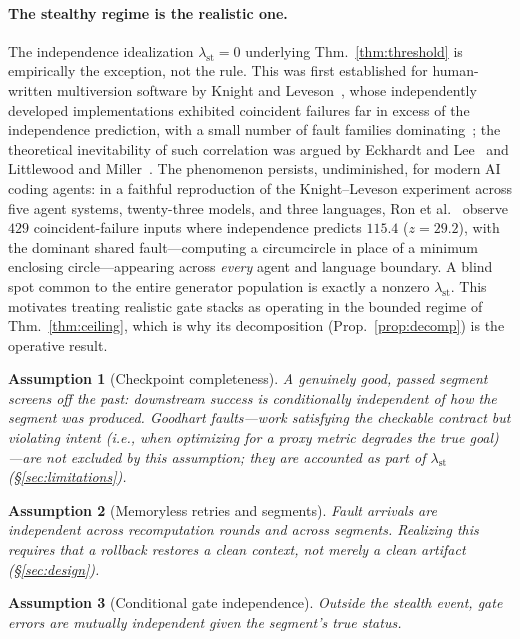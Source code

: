 \documentclass[11pt]{article}
\newtheorem{assumption}{Assumption}
\theoremstyle{remark}
\newcommand{\lst}{\lambda_{\mathrm{st}}}
\begin{document}
\paragraph{The stealthy regime is the realistic one.} The independence idealization $\lst=0$
underlying Thm.~\ref{thm:threshold} is empirically the exception, not the rule.
This was first
established for human-written multiversion software by Knight and Leveson~\cite{knight1986}, whose
independently developed implementations exhibited coincident failures far in excess of the
independence prediction, with a small number of fault families dominating~\cite{brilliant1990};
the theoretical inevitability of such correlation was argued by Eckhardt and Lee~\cite{eckhardt1985}
and Littlewood and Miller~\cite{littlewood1989}.
The phenomenon persists, undiminished, for modern
AI coding agents: in a faithful reproduction of the Knight--Leveson experiment across five agent
systems, twenty-three models, and three languages, Ron et al.~\cite{ron2026} observe $429$
coincident-failure inputs where independence predicts $115.4$ ($z=29.2$), with the dominant
shared fault---computing a circumcircle in place of a minimum enclosing circle---appearing across
\emph{every} agent and language boundary.
A blind spot common to the entire generator population
is exactly a nonzero $\lst$.
This motivates treating realistic gate stacks as operating in the bounded regime of
Thm.~\ref{thm:ceiling}, which is why its decomposition (Prop.~\ref{prop:decomp}) is the operative
result.
\begin{assumption}[Checkpoint completeness]\label{a1}
A genuinely good, passed segment screens off the past: downstream success is conditionally
independent of how the segment was produced.
Goodhart faults---work satisfying the checkable contract but violating intent (i.e., when optimizing for a proxy metric degrades the true goal)---are not excluded by this assumption; they are accounted as part of $\lst$ (\S\ref{sec:limitations}).
\end{assumption}
\begin{assumption}[Memoryless retries and segments]\label{a2}
Fault arrivals are independent across recomputation rounds and across segments.
Realizing this
requires that a rollback restores a clean context, not merely a clean artifact
(\S\ref{sec:design}).
\end{assumption}
\begin{assumption}[Conditional gate independence]\label{a3}
Outside the stealth event, gate errors are mutually independent given the segment's true status.
\end{assumption}
\end{document}

